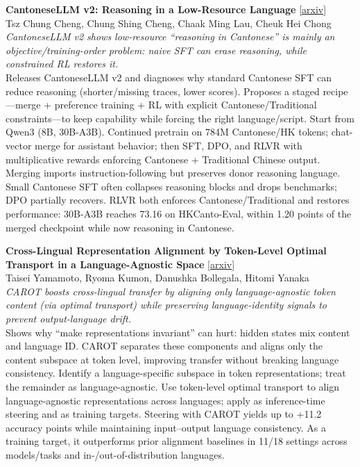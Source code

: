 \documentclass[12pt,letterpaper]{article}
\begin{document}
\medskip

{\small\textbf{CantoneseLLM v2: Reasoning in a Low-Resource Language}} {\scriptsize[\href{https://arxiv.org/abs/2609.06970}{arxiv}]}\\
{\scriptsize Tsz Chung Cheng, Chung Shing Cheng, Chaak Ming Lau, Cheuk Hei Chong}\\

{\small\textit{CantoneseLLM v2 shows low-resource ``reasoning in Cantonese'' is mainly an objective/training-order problem: naive SFT can erase reasoning, while constrained RL restores it.}}\\[1pt]
{\footnotesize Releases CantoneseLLM v2 and diagnoses why standard Cantonese SFT can reduce reasoning (shorter/missing traces, lower scores). Proposes a staged recipe---merge + preference training + RL with explicit Cantonese/Traditional constraints---to keep capability while forcing the right language/script. Start from Qwen3 (8B, 30B-A3B). Continued pretrain on 784M Cantonese/HK tokens; chat-vector merge for assistant behavior; then SFT, DPO, and RLVR with multiplicative rewards enforcing Cantonese + Traditional Chinese output. Merging imports instruction-following but preserves donor reasoning language. Small Cantonese SFT often collapses reasoning blocks and drops benchmarks; DPO partially recovers. RLVR both enforces Cantonese/Traditional and restores performance: 30B-A3B reaches 73.16 on HKCanto-Eval, within 1.20 points of the merged checkpoint while now reasoning in Cantonese.}

\medskip

{\small\textbf{Cross-Lingual Representation Alignment by Token-Level Optimal Transport in a Language-Agnostic Space}} {\scriptsize[\href{https://arxiv.org/abs/2609.06381}{arxiv}]}\\
{\scriptsize Taisei Yamamoto, Ryoma Kumon, Danushka Bollegala, Hitomi Yanaka}\\

{\small\textit{CAROT boosts cross-lingual transfer by aligning only language-agnostic token content (via optimal transport) while preserving language-identity signals to prevent output-language drift.}}\\[1pt]
{\footnotesize Shows why ``make representations invariant'' can hurt: hidden states mix content and language ID. CAROT separates these components and aligns only the content subspace at token level, improving transfer without breaking language consistency. Identify a language-specific subspace in token representations; treat the remainder as language-agnostic. Use token-level optimal transport to align language-agnostic representations across languages; apply as inference-time steering and as training targets. Steering with CAROT yields up to +11.2 accuracy points while maintaining input--output language consistency. As a training target, it outperforms prior alignment baselines in 11/18 settings across models/tasks and in-/out-of-distribution languages.}
\end{document}
